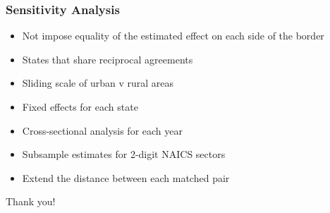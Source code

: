 \documentclass{beamer}
\begin{document}
\begin{frame}
\frametitle{Sensitivity Analysis}
\begin{itemize}
\item Not impose equality of the estimated effect on each side of the border
\item States that share reciprocal agreements
\item Sliding scale of urban v rural areas
\item Fixed effects for each state
\item Cross-sectional analysis for each year
\item Subsample estimates for 2-digit NAICS sectors
\item Extend the distance between each matched pair
\end{itemize}
\end{frame}

\begin{frame}

Thank you!

\end{frame}
\end{document}
